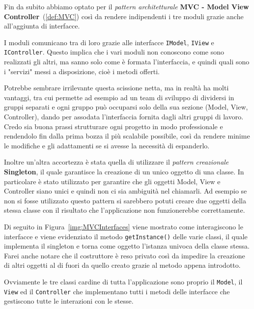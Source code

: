 		Fin da subito abbiamo optato per il \textit{pattern architetturale} \textbf{MVC - Model View Controller}~(\ref{def:MVC}) così da rendere indipendenti i tre moduli grazie anche all'aggiunta di interfacce.
		
		I moduli comunicano tra di loro grazie alle interfacce \verb|IModel|, \verb|IView| e \verb|IController|.
		Questo implica che i vari moduli non conoscono come sono realizzati gli altri, ma sanno solo come è formata l'interfaccia, e quindi quali sono i "servizi" messi a disposizione, cioè i metodi offerti.
		
		Potrebbe sembrare irrilevante questa scissione netta, ma in realtà ha molti vantaggi, tra cui permette ad esempio ad un team di sviluppo di dividersi in gruppi separati e ogni gruppo può occuparsi solo della sua sezione (Model, View, Controller), dando per assodata l'interfaccia fornita dagli altri gruppi di lavoro. Credo sia buona prassi strutturare ogni progetto in modo professionale e rendendolo fin dalla prima bozza il più scalabile possibile, così da rendere minime le modifiche e gli adattamenti se si avesse la necessità di espanderlo.
		
		Inoltre un'altra accortezza è stata quella di utilizzare il \textit{pattern creazionale} \textbf{Singleton}, il quale garantisce la creazione di un unico oggetto di una classe. In particolare è stato utilizzato per garantire che gli oggetti Model, View e Controller siano unici e quindi non ci sia ambiguità nel chiamarli. Ad esempio se non si fosse utilizzato questo pattern si sarebbero potuti creare due oggetti della stessa classe con il risultato che l'applicazione non funzionerebbe correttamente.
		
		Di seguito in Figura~\ref{img:MVCInterfaces} viene mostrato come interagiscono le interfacce e viene evidenziato il metodo \texttt{getInstance()} delle varie classi, il quale implementa il singleton e torna come oggetto l'istanza univoca della classe stessa. Farei anche notare che il costruttore è reso privato così da impedire la creazione di altri oggetti al di fuori da quello creato grazie al metodo appena introdotto.
		
		\begin{center}
			\label{img:MVCInterfaces}
		\end{center}
		
		Ovviamente le tre classi cardine di tutta l'applicazione sono proprio il \verb|Model|, il \verb|View| ed il \verb|Controller| che implementano tutti i metodi delle interfacce che gestiscono tutte le interazioni con le stesse.
		
